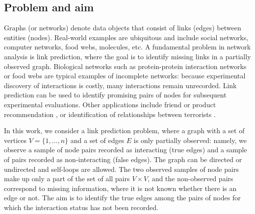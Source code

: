 \documentclass[a4paper, 11pt]{article}
\theoremstyle{remark}
\begin{document}
\subsection{Problem and aim} 

Graphs (or networks) denote data objects that consist of links (edges) between entities (nodes). Real-world examples are ubiquitous and include social networks, computer networks, food webs, molecules, etc. 
A fundamental problem in network analysis is link prediction, where the goal is to %
identify missing links 
in a partially observed graph. 
Biological networks such as protein-protein interaction networks \citep{PPI19} or food webs \citep{foodweb20} are typical examples of incomplete networks: because experimental discovery of interactions is costly, many interactions remain unrecorded. Link prediction can be used to identify promising pairs of nodes for subsequent experimental evaluations. Other applications include friend or product recommendation \citep{li13}, or identification of relationships between terrorists \citep{clauset2008hierarchical}. 


In this work, we consider a link prediction problem, where a graph with a set of vertices $V = \{1, \dots, n \}$ and a set of edges $E$ is only partially observed: namely, we observe a sample of node pairs recorded as interacting (true edges) and a sample of pairs recorded as non-interacting (false edges). The graph can be directed or undirected and self-loops are allowed. The two observed samples of node pairs make up only a part of the set of all pairs $V \times V$, and the non-observed pairs correspond to missing information, where it is not known whether there is an edge or not. The aim is to identify the true edges among the pairs of nodes for which the interaction status has not been recorded.
\end{document}
